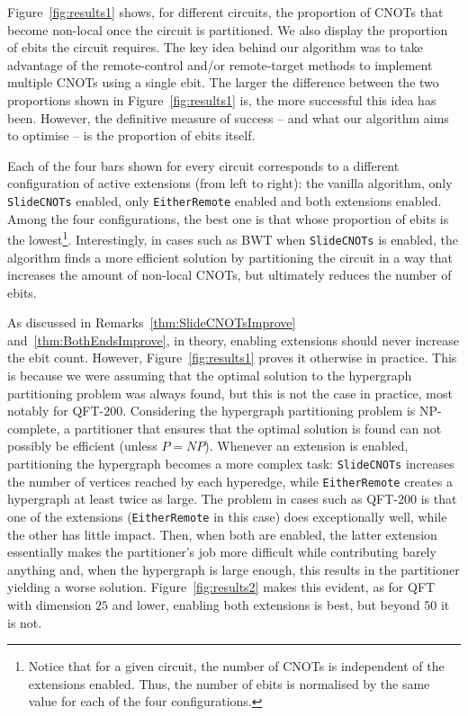 Figure~\ref{fig:results1} shows, for different circuits, the proportion of CNOTs that become non-local once the circuit is partitioned. We also display the proportion of ebits the circuit requires. The key idea behind our algorithm was to take advantage of the remote-control and/or remote-target methods to implement multiple CNOTs using a single ebit. The larger the difference between the two proportions shown in Figure~\ref{fig:results1} is, the more successful this idea has been. However, the definitive measure of success -- and what our algorithm aims to optimise -- is the proportion of ebits itself. 



Each of the four bars shown for every circuit corresponds to a different configuration of active extensions (from left to right): the vanilla algorithm, only \texttt{SlideCNOTs} enabled, only \texttt{EitherRemote} enabled and both extensions enabled. Among the four configurations, the best one is that whose proportion of ebits is the lowest\footnote{Notice that for a given circuit, the number of CNOTs is independent of the extensions enabled. Thus, the number of ebits is normalised by the same value for each of the four configurations.}. Interestingly, in cases such as BWT when \texttt{SlideCNOTs} is enabled, the algorithm finds a more efficient solution by partitioning the circuit in a way that increases the amount of non-local CNOTs, but ultimately reduces the number of ebits.

As discussed in Remarks~\ref{thm:SlideCNOTsImprove} and~\ref{thm:BothEndsImprove}, in theory, enabling extensions should never increase the ebit count. However, Figure~\ref{fig:results1} proves it otherwise in practice. This is because we were assuming that the optimal solution to the hypergraph partitioning problem was always found, but this is not the case in practice, most notably for QFT-\(200\). Considering the hypergraph partitioning problem is NP-complete, a partitioner that ensures that the optimal solution is found can not possibly be efficient (unless \(P=NP\)). Whenever an extension is enabled, partitioning the hypergraph becomes a more complex task: \texttt{SlideCNOTs} increases the number of vertices reached by each hyperedge, while \texttt{EitherRemote} creates a hypergraph at least twice as large. The problem in cases such as QFT-\(200\) is that one of the extensions (\texttt{EitherRemote} in this case) does exceptionally well, while the other has little impact. Then, when both are enabled, the latter extension essentially makes the partitioner's job more difficult while contributing barely anything and, when the hypergraph is large enough, this results in the partitioner yielding a worse solution. Figure~\ref{fig:results2} makes this evident, as for QFT with dimension \(25\) and lower, enabling both extensions is best, but beyond \(50\) it is not. 

